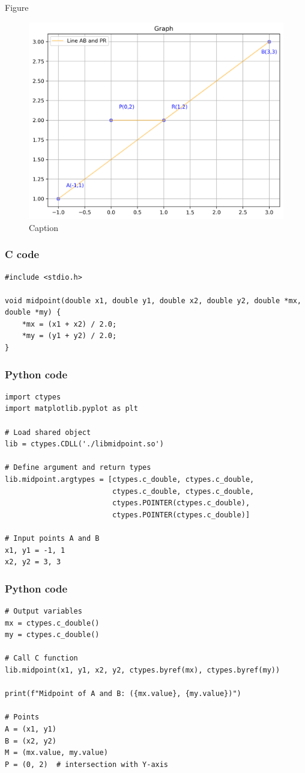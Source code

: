 \documentclass{beamer}
\begin{document}
\begin{frame}{Figure}
    \begin{figure}
        \centering
        \includegraphics[width=0.8\columnwidth]{figs/figure.png}
        \caption{Caption}
        \label{fig:placeholder}
    \end{figure}
\end{frame}
\begin{frame}[fragile]
\frametitle{C code}
\begin{lstlisting}
#include <stdio.h>

void midpoint(double x1, double y1, double x2, double y2, double *mx, double *my) {
    *mx = (x1 + x2) / 2.0;
    *my = (y1 + y2) / 2.0;
}
\end{lstlisting}
\end{frame}
\begin{frame}[fragile]
\frametitle{Python code}
\begin{lstlisting}
import ctypes
import matplotlib.pyplot as plt

# Load shared object
lib = ctypes.CDLL('./libmidpoint.so')

# Define argument and return types
lib.midpoint.argtypes = [ctypes.c_double, ctypes.c_double,
                         ctypes.c_double, ctypes.c_double,
                         ctypes.POINTER(ctypes.c_double),
                         ctypes.POINTER(ctypes.c_double)]

# Input points A and B
x1, y1 = -1, 1
x2, y2 = 3, 3
\end{lstlisting}
\end{frame}
\begin{frame}[fragile]
\frametitle{Python code}
\begin{lstlisting}
# Output variables
mx = ctypes.c_double()
my = ctypes.c_double()

# Call C function
lib.midpoint(x1, y1, x2, y2, ctypes.byref(mx), ctypes.byref(my))

print(f"Midpoint of A and B: ({mx.value}, {my.value})")

# Points
A = (x1, y1)
B = (x2, y2)
M = (mx.value, my.value)
P = (0, 2)  # intersection with Y-axis
\end{lstlisting}
\end{frame}
\end{document}
